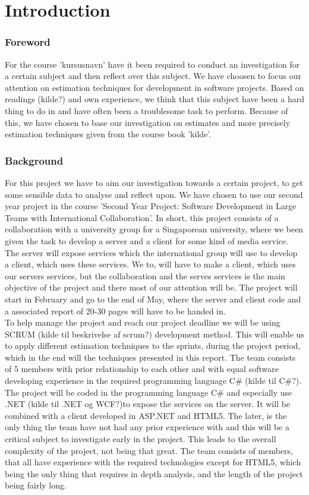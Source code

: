 \part{Introduction}
\section{Foreword}
For the course 'kursusnavn' have it been required to conduct an investigation for a certain subject and then reflect over this subject. We have choosen to focus our attention on estimation techniques for development in software projects. Based on readings (kilde?) and own experience, we think that this subject have been a hard thing to do in and have often been a  troublesome task to perform. Because of this, we have chosen to base our investigation on estimates and more precisely estimation techniques given from the course book 'kilde'. 

\section{Background}
For this project we have to aim our investigation towards a certain project, to get some sensible data to analyse and reflect upon. We have chosen to use our second year project in the course 'Second Year Project: Software Development in Large Teams with International Collaboration'. In short, this project consists of a collaboration with a university group for a Singaporean university, where we been given the task to develop a server and a client for some kind of media service. The server will expose services which the international group will use to develop a client, which uses these services. We to, will have to make a client, which uses our servers services, but the collaboration and the serves services is the main objective of the project and there most of our attention will be. The project will start in February and go to the end of May, where the server and client code and a associated report of 20-30 pages will have to be handed in. \\ 

To help manage the project and reach our project deadline we will be using SCRUM (kilde til beskrivelse af scrum?) development method. This will enable us to apply different estimation techniques to the sprints, during the project period, which in the end will the techniques presented in this report. The team consists of 5 members with prior relationship to each other and with equal software developing experience in the required programming language C\# (kilde til C\#?). The project will be coded in the programming language C\# and especially use .NET (kilde til .NET og WCF?)to expose the services on the server. It will be combined with a client developed in ASP.NET and HTML5. The later, is the only thing the team have not had any prior experience with and this will be a critical subject to investigate early in the project.  This leads to the overall complexity of the project, not being that great. The team consists of members, that all have experience with the required technologies except for HTML5, which being the only thing that requires in depth analysis, and the length of the project being fairly long. 


